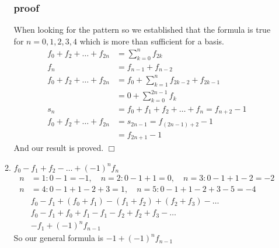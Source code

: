 \documentclass{article}
\begin{document}
\begin{enumerate}
\begin{enumerate}
\subsubsection*{proof}
When looking for the pattern so we established that the formula is true for $n=0,1,2,3,4$ which is more than sufficient for a basis.
\begin{align*}
  f_0+f_2+\dots+f_{2n}&=\sum\limits_{k=0}^n{f_{2k}}\\
  f_n&=f_{n-1}+f_{n-2}\\
  f_0+f_2+\dots+f_{2n}&=f_0+\sum\limits_{k=1}^n{f_{2k-2}+f_{2k-1}}\\
  &=0+\sum\limits_{k=0}^{2n-1}{f_{k}}\\
  s_n&=f_0+f_1+f_2+\dots+f_n=f_{n+2}-1\\
  f_0+f_2+\dots+f_{2n}&=s_{2n-1}=f_{(2n-1)+2}-1\\
  &=f_{2n+1}-1
\end{align*}
And our result is proved. $\Box$
\item
$f_0-f_1+f_2-\dots+(-1)^nf_{n}$
\begin{align*}
  n&=1:0-1=-1,\quad n=2:0-1+1=0,\quad n=3:0-1+1-2=-2\\
  n&=4:0-1+1-2+3=1,\quad n=5:0-1+1-2+3-5=-4\\
  &f_0-f_1+(f_0+f_1)-(f_1+f_2)+(f_2+f_3)-\dots\\
  &f_0-f_1+f_0+f_1-f_1-f_2+f_2+f_3-\dots\\
  &-f_1+(-1)^nf_{n-1}
\end{align*}
So our general formula is $-1+(-1)^nf_{n-1}$

\end{enumerate}
\end{enumerate}
\end{document}
